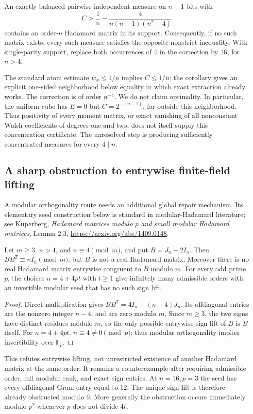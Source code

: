 \begin{corollary}
\label{s10:cor:discrete-gap}
An exactly balanced pairwise independent measure on $n-1$ bits with
\[
 C>\frac1n-\frac4{n(n-1)(n^2-4)}
\]
contains an order-$n$ Hadamard matrix in its support. Consequently,
if no such matrix exists, every such measure satisfies the opposite
nonstrict inequality. With single-parity support, replace both occurrences
of $4$ in the correction by $16$, for $n>4$.
\end{corollary}
The standard atom estimate $w_x\le1/n$ implies $C\le1/n$;
the corollary gives an explicit one-sided neighborhood below equality
in which exact extraction already works. The correction is of order
$n^{-4}$. We do not claim optimality. In particular, the uniform cube
has $E=0$ but $C=2^{-(n-1)}$, far outside this neighborhood.
Thus positivity of every moment matrix, or exact vanishing of all
nonconstant Walsh coefficients of degrees one and two, does not itself
supply this concentration certificate. The unresolved step is producing
sufficiently concentrated measures for every $4\mid n$.

\subsection{A sharp obstruction to entrywise finite-field lifting}
A modular orthogonality route needs an additional global repair mechanism.
Its elementary seed construction below is standard in modular-Hadamard
literature; see Kuperberg, \emph{Hadamard matrices modulo $p$ and small
modular Hadamard matrices}, Lemma 2.3,
\url{https://arxiv.org/abs/1409.0148}.
\begin{proposition}
\label{s10:prop:discrete-modular}
Let $m\ge3$, $n>4$, and $n\equiv4\pmod m$, and put $B=J_n-2I_n$.
Then $BB^T\equiv nI_n\pmod m$, but $B$ is not a real Hadamard matrix.
Moreover there is no real Hadamard matrix entrywise congruent to $B$
modulo $m$. For every odd prime $p$, the choices $n=4+4pt$ with $t\ge1$
give infinitely many admissible orders with an invertible modular seed
that has no such sign lift.
\end{proposition}
\begin{proof}
Direct multiplication gives $BB^T=4I_n+(n-4)J_n$.
Its offdiagonal entries are the nonzero integer $n-4$, and are zero
modulo $m$. Since $m\ge3$, the two signs have distinct residues modulo
$m$, so the only possible entrywise sign lift of $B$ is $B$ itself.
For $n=4+4pt$, $n\equiv4\ne0\pmod p$; thus modular orthogonality
implies invertibility over $\mathbb F_p$.
\end{proof}
This refutes entrywise lifting, not unrestricted existence of another
Hadamard matrix at the same order. It remains a counterexample after
requiring admissible order, full modular rank, and exact sign entries.
At $n=16,p=3$ the seed has every offdiagonal Gram entry equal to $12$.
The unique sign lift is therefore already obstructed modulo $9$.
More generally the obstruction occurs immediately modulo $p^2$ whenever
$p$ does not divide $4t$.

